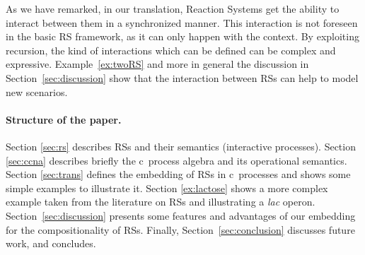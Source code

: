 As we have remarked, in our translation, Reaction Systems 
get the ability to interact between them in a synchronized manner. 
This interaction is not foreseen in
the basic RS framework, as it can only happen with the context.
By exploiting recursion, the kind of interactions which can be 
defined can be complex and expressive.
Example~\ref{ex:twoRS} and more in general the discussion in 
Section~\ref{sec:discussion} show that 
the interaction between RSs can help to model new scenarios.

\paragraph{Structure of the paper.} Section \ref{sec:rs} 
describes RSs and their semantics (interactive processes).
Section \ref{sec:ccna} describes briefly the c\CNA \ process algebra and
its operational semantics.
Section \ref{sec:trans} defines the embedding of RSs in
c\CNA \ processes and shows some simple examples to illustrate 
it.
Section \ref{ex:lactose} shows a more complex example taken from
the literature on RSs and illustrating a \emph{lac} operon.
Section~\ref{sec:discussion} presents some features and 
advantages of our embedding for the compositionality of RSs.
Finally, Section~\ref{sec:conclusion}
discusses future work, and concludes.


